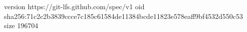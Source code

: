 version https://git-lfs.github.com/spec/v1
oid sha256:71c2c2b3839ccce7c185c61584de11384bcde11823e578eaff9bf4532d550c53
size 196704

